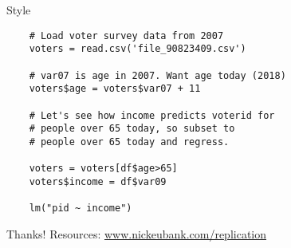 \documentclass[11pt]{beamer}
\begin{document}
\begin{frame}[c, fragile]{Style}
    \begin{verbatim}
    # Load voter survey data from 2007
    voters = read.csv('file_90823409.csv')

    # var07 is age in 2007. Want age today (2018)
    voters$age = voters$var07 + 11

    # Let's see how income predicts voterid for
    # people over 65 today, so subset to
    # people over 65 today and regress.

    voters = voters[df$age>65]
    voters$income = df$var09

    lm("pid ~ income")
    \end{verbatim}
\end{frame}

\begin{frame}[c]{Thanks!}
    Resources:
    \url{www.nickeubank.com/replication}
\end{frame}
\end{document}
